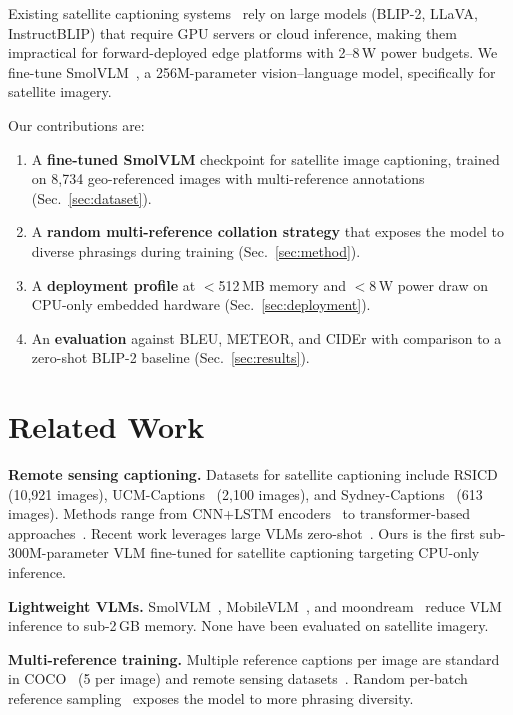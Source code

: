 \documentclass[conference]{IEEEtran}
\begin{document}
Existing satellite captioning systems~\cite{rsicd,ucm,sydney} rely on large models (BLIP-2,
LLaVA, InstructBLIP) that require GPU servers or cloud inference, making them impractical for
forward-deployed edge platforms with 2--8\,W power budgets. We fine-tune SmolVLM~\cite{smolvlm},
a 256M-parameter vision--language model, specifically for satellite imagery.

Our contributions are:
\begin{enumerate}
    \item A \textbf{fine-tuned SmolVLM} checkpoint for satellite image captioning, trained on
          8,734 geo-referenced images with multi-reference annotations (Sec.~\ref{sec:dataset}).
    \item A \textbf{random multi-reference collation strategy} that exposes the model to diverse
          phrasings during training (Sec.~\ref{sec:method}).
    \item A \textbf{deployment profile} at $<$512\,MB memory and $<$8\,W power draw on CPU-only
          embedded hardware (Sec.~\ref{sec:deployment}).
    \item An \textbf{evaluation} against BLEU, METEOR, and CIDEr with comparison to a zero-shot
          BLIP-2 baseline (Sec.~\ref{sec:results}).
\end{enumerate}

\section{Related Work}
\label{sec:related}

\textbf{Remote sensing captioning.}
Datasets for satellite captioning include RSICD~\cite{rsicd} (10,921 images), UCM-Captions~\cite{ucm}
(2,100 images), and Sydney-Captions~\cite{sydney} (613 images). Methods range from CNN+LSTM
encoders~\cite{lstm_rs} to transformer-based approaches~\cite{rs_transformer}. Recent work
leverages large VLMs zero-shot~\cite{skysense}. Ours is the first sub-300M-parameter VLM
fine-tuned for satellite captioning targeting CPU-only inference.

\textbf{Lightweight VLMs.}
SmolVLM~\cite{smolvlm}, MobileVLM~\cite{mobilevlm}, and moondream~\cite{moondream} reduce
VLM inference to sub-2\,GB memory. None have been evaluated on satellite imagery.

\textbf{Multi-reference training.}
Multiple reference captions per image are standard in COCO~\cite{coco} (5 per image) and
remote sensing datasets~\cite{rsicd}. Random per-batch reference sampling~\cite{rand_caption}
exposes the model to more phrasing diversity.
\end{document}

